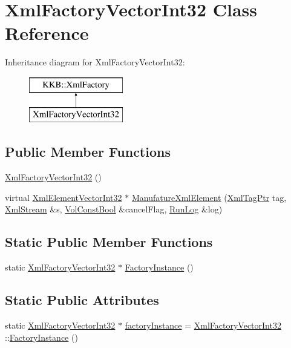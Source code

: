 \hypertarget{class_xml_factory_vector_int32}{}\section{Xml\+Factory\+Vector\+Int32 Class Reference}
\label{class_xml_factory_vector_int32}
Inheritance diagram for Xml\+Factory\+Vector\+Int32\+:\begin{figure}[H]
\begin{center}
\leavevmode
\includegraphics[height=2.000000cm]{class_xml_factory_vector_int32}
\end{center}
\end{figure}
\subsection*{Public Member Functions}
\begin{DoxyCompactItemize}
\item 
\hyperlink{class_xml_factory_vector_int32_a2182a52d3ae073f523a34860164efbb6}{Xml\+Factory\+Vector\+Int32} ()
\item 
virtual \hyperlink{class_k_k_b_1_1_xml_element_vector_int32}{Xml\+Element\+Vector\+Int32} $\ast$ \hyperlink{class_xml_factory_vector_int32_a58a0f0c67cb99f2df7a0ada497d76fcd}{Manufature\+Xml\+Element} (\hyperlink{namespace_k_k_b_a9253a3ea8a5da18ca82be4ca2b390ef0}{Xml\+Tag\+Ptr} tag, \hyperlink{class_k_k_b_1_1_xml_stream}{Xml\+Stream} \&s, \hyperlink{namespace_k_k_b_a7d390f568e2831fb76b86b56c87bf92f}{Vol\+Const\+Bool} \&cancel\+Flag, \hyperlink{class_k_k_b_1_1_run_log}{Run\+Log} \&log)
\end{DoxyCompactItemize}
\subsection*{Static Public Member Functions}
\begin{DoxyCompactItemize}
\item 
static \hyperlink{class_xml_factory_vector_int32}{Xml\+Factory\+Vector\+Int32} $\ast$ \hyperlink{class_xml_factory_vector_int32_a4a0a724a36dd982772e5a13a9e59324a}{Factory\+Instance} ()
\end{DoxyCompactItemize}
\subsection*{Static Public Attributes}
\begin{DoxyCompactItemize}
\item 
static \hyperlink{class_xml_factory_vector_int32}{Xml\+Factory\+Vector\+Int32} $\ast$ \hyperlink{class_xml_factory_vector_int32_a7fbc7166d8d08d7cf408482135aeaf3b}{factory\+Instance} = \hyperlink{class_xml_factory_vector_int32}{Xml\+Factory\+Vector\+Int32} \+::\hyperlink{class_xml_factory_vector_int32_a4a0a724a36dd982772e5a13a9e59324a}{Factory\+Instance} ()
\end{DoxyCompactItemize}


